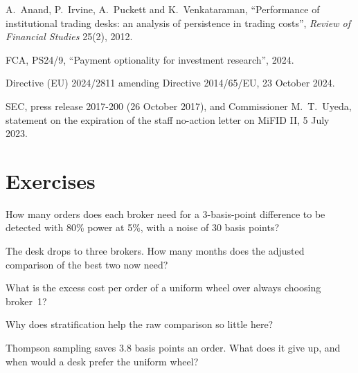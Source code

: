 \begin{omsources}
\item A.~Anand, P.~Irvine, A.~Puckett and K.~Venkataraman, ``Performance of institutional trading desks: an analysis of persistence in trading
costs'', \emph{Review of Financial Studies} 25(2), 2012.
\item FCA, PS24/9, ``Payment optionality for investment research'', 2024.
\item Directive (EU) 2024/2811 amending Directive 2014/65/EU, 23 October 2024.
\item SEC, press release 2017-200 (26 October 2017), and Commissioner M.~T.~Uyeda, statement on the expiration of the staff no-action letter on
MiFID II, 5 July 2023.
\end{omsources}

\section{Exercises}

\begin{exercise}[$\star$]\label{exo:mx:the-buy-side-trading-desk-and-its-brokers:1}
How many orders does each broker need for a 3-basis-point difference to be detected with 80\% power at 5\%, with a noise of 30 basis points?
\end{exercise}

\begin{exercise}[$\star$]\label{exo:mx:the-buy-side-trading-desk-and-its-brokers:2}
The desk drops to three brokers. How many months does the adjusted comparison of the best two now need?
\end{exercise}

\begin{exercise}[$\star$]\label{exo:mx:the-buy-side-trading-desk-and-its-brokers:3}
What is the excess cost per order of a uniform wheel over always choosing broker~1?
\end{exercise}

\begin{exercise}[$\star\star$]\label{exo:mx:the-buy-side-trading-desk-and-its-brokers:4}
Why does stratification help the raw comparison so little here?
\end{exercise}

\begin{exercise}[$\star\star$]\label{exo:mx:the-buy-side-trading-desk-and-its-brokers:5}
Thompson sampling saves 3.8 basis points an order. What does it give up, and when would a desk prefer the uniform wheel?
\end{exercise}

